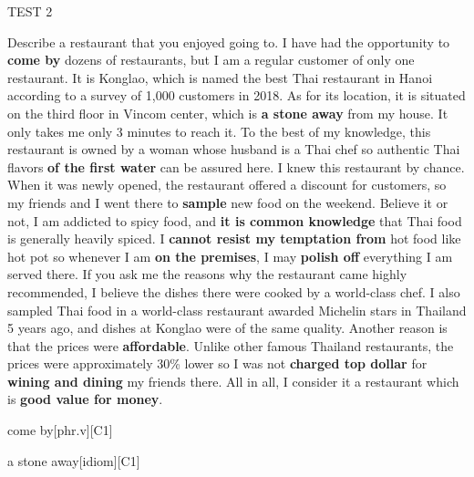 \begin{glossarymc}[Cambridge 8]
\begin{test}{TEST 2}
\begin{qa}{Describe a restaurant that you enjoyed going to.}
    I have had the opportunity to \textbf{come by} dozens of restaurants, but I am a regular customer of only one restaurant. It is Konglao, which is named the best Thai restaurant in Hanoi according to a survey of 1,000 customers in 2018. As for its location, it is situated on the third floor in Vincom center, which is \textbf{a stone away} from my house. It only takes me only 3 minutes to reach it. To the best of my knowledge, this restaurant is owned by a woman whose husband is a Thai chef so authentic Thai flavors \textbf{of the first water} can be assured here. I knew this restaurant by chance. When it was newly opened, the restaurant offered a discount for customers, so my friends and I went there to \textbf{sample} new food on the weekend. Believe it or not, I am addicted to spicy food, and \textbf{it is common knowledge} that Thai food is generally heavily spiced. I \textbf{cannot resist my temptation from} hot food like hot pot so whenever I am \textbf{on the premises}, I may \textbf{polish off} everything I am served there. If you ask me the reasons why the restaurant came highly recommended, I believe the dishes there were cooked by a world-class chef. I also sampled Thai food in a world-class restaurant awarded Michelin stars in Thailand 5 years ago, and dishes at Konglao were of the same quality. Another reason is that the prices were \textbf{affordable}. Unlike other famous Thailand restaurants, the prices were approximately 30\% lower so I was not \textbf{charged top dollar} for \textbf{wining and dining} my friends there. All in all, I consider it a restaurant which is \textbf{good value for money}.
    \end{qa}

        \begin{VocabExplain}[Part 2]
            \begin{ExplainCard}{come by}[phr.v][C1]
            \end{ExplainCard}

            \begin{ExplainCard}{a stone away}[idiom][C1]
            \end{ExplainCard}


\end{VocabExplain}
\end{test}
\end{glossarymc}
